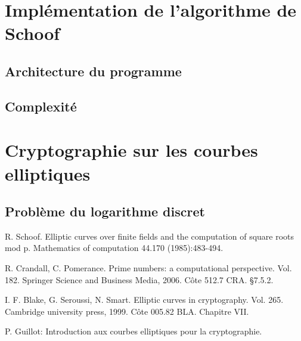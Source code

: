 \documentclass[letterpaper, 12pt]{article}
\begin{document}
\section{Implémentation de l'algorithme de Schoof}
    \subsection{Architecture du programme}
    \subsection{Complexité}

\section{Cryptographie sur les courbes elliptiques}
    \subsection{Problème du logarithme discret}

\newpage
\newpage
\begin{thebibliography}{99}
\item R. Schoof. Elliptic curves over finite fields and the computation of square roots mod p. Mathematics of computation 44.170 (1985):483-494.

\item R. Crandall, C. Pomerance. Prime numbers: a computational perspective. Vol. 182. Springer Science and Business Media, 2006. Côte 512.7 CRA. §7.5.2.

\item I. F. Blake, G. Seroussi, N. Smart. Elliptic curves in cryptography. Vol. 265. Cambridge university press, 1999. Côte 005.82 BLA. Chapitre VII.

\item P. Guillot: Introduction aux courbes elliptiques pour la cryptographie.
\end{thebibliography}
\end{document}
